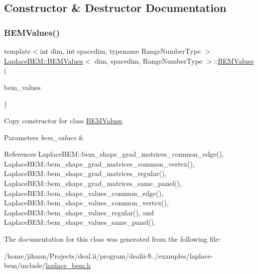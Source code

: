 \subsection{Constructor \& Destructor Documentation}
\mbox{\label{classLaplaceBEM_1_1BEMValues_ac40a849631e782f840a927e68bc2f9f6}} 
\subsubsection{\texorpdfstring{B\+E\+M\+Values()}{BEMValues()}}
{\footnotesize\ttfamily template$<$int dim, int spacedim, typename Range\+Number\+Type $>$ \\
\hyperlink{classLaplaceBEM_1_1BEMValues}{Laplace\+B\+E\+M\+::\+B\+E\+M\+Values}$<$ dim, spacedim, Range\+Number\+Type $>$\+::\hyperlink{classLaplaceBEM_1_1BEMValues}{B\+E\+M\+Values} (\begin{DoxyParamCaption}\item[{const \hyperlink{classLaplaceBEM_1_1BEMValues}{B\+E\+M\+Values}$<$ dim, spacedim, Range\+Number\+Type $>$ \&}]{bem\+\_\+values }\end{DoxyParamCaption})}

Copy constructor for class {\ttfamily \hyperlink{classLaplaceBEM_1_1BEMValues}{B\+E\+M\+Values}}. 
\begin{DoxyParams}{Parameters}
{\em bem\+\_\+values} & \\
\hline
\end{DoxyParams}


References Laplace\+B\+E\+M\+::bem\+\_\+shape\+\_\+grad\+\_\+matrices\+\_\+common\+\_\+edge(), Laplace\+B\+E\+M\+::bem\+\_\+shape\+\_\+grad\+\_\+matrices\+\_\+common\+\_\+vertex(), Laplace\+B\+E\+M\+::bem\+\_\+shape\+\_\+grad\+\_\+matrices\+\_\+regular(), Laplace\+B\+E\+M\+::bem\+\_\+shape\+\_\+grad\+\_\+matrices\+\_\+same\+\_\+panel(), Laplace\+B\+E\+M\+::bem\+\_\+shape\+\_\+values\+\_\+common\+\_\+edge(), Laplace\+B\+E\+M\+::bem\+\_\+shape\+\_\+values\+\_\+common\+\_\+vertex(), Laplace\+B\+E\+M\+::bem\+\_\+shape\+\_\+values\+\_\+regular(), and Laplace\+B\+E\+M\+::bem\+\_\+shape\+\_\+values\+\_\+same\+\_\+panel().



The documentation for this class was generated from the following file\+:\begin{DoxyCompactItemize}
\item 
/home/jihuan/\+Projects/deal.\+ii/program/dealii-\/9../examples/laplace-\/bem/include/\hyperlink{laplace__bem_8h}{laplace\+\_\+bem.\+h}\end{DoxyCompactItemize}
